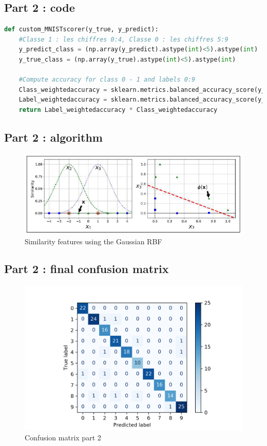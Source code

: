 \subsection{Part 2 : code}
\label{appendix:code_part2}
\begin{lstlisting}[language=Python]
def custom_MNISTscorer(y_true, y_predict):
    #Classe 1 : les chiffres 0:4, Classe 0 : les chiffres 5:9
    y_predict_class = (np.array(y_predict).astype(int)<5).astype(int)
    y_true_class = (np.array(y_true).astype(int)<5).astype(int)
    
    #Compute accuracy for class 0 - 1 and labels 0:9
    Class_weightedaccuracy = sklearn.metrics.balanced_accuracy_score(y_true_class, y_predict_class)
    Label_weightedaccuracy = sklearn.metrics.balanced_accuracy_score(y_true, y_predict)
    return Label_weightedaccuracy * Class_weightedaccuracy
\end{lstlisting}


\subsection{Part 2 : algorithm}
\begin{figure}[h]
	\centering 
	\includegraphics{Pics/RBF}
	\caption{Similarity features using the Gaussian RBF}
	\label{fig:rbfgaussian}
\end{figure} 

\subsection{Part 2 : final confusion matrix}
\begin{figure}[h]
	\centering 
	\includegraphics[scale=0.7]{Pics/part2confusion_mat}
	\caption{Confusion matrix part 2}
	\label{fig:confusion}
\end{figure} 

